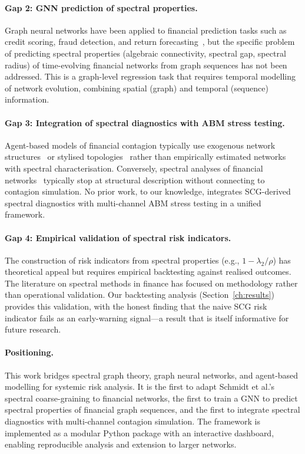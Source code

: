\paragraph{Gap 2: GNN prediction of spectral properties.}
Graph neural networks have been applied to financial prediction tasks
such as credit scoring, fraud detection, and return
forecasting~\cite{wu2020comprehensive}, but the specific problem of
predicting spectral properties (algebraic connectivity, spectral gap,
spectral radius) of time-evolving financial networks from graph
sequences has not been addressed.  This is a graph-level regression
task that requires temporal modelling of network evolution, combining
spatial (graph) and temporal (sequence) information.

\paragraph{Gap 3: Integration of spectral diagnostics with ABM stress
testing.}
Agent-based models of financial contagion typically use exogenous network
structures~\cite{nier2007network,poledna2015economics} or stylised
topologies~\cite{gai2010contagion} rather than empirically estimated
networks with spectral characterisation.  Conversely, spectral analyses
of financial networks~\cite{kyriakopoulos2009network} typically stop at
structural description without connecting to contagion simulation.  No
prior work, to our knowledge, integrates SCG-derived spectral
diagnostics with multi-channel ABM stress testing in a unified framework.

\paragraph{Gap 4: Empirical validation of spectral risk indicators.}
The construction of risk indicators from spectral properties (e.g.,
$1 - \lambda_2/\rho$) has theoretical appeal but requires empirical
backtesting against realised outcomes.  The literature on spectral
methods in finance has focused on methodology rather than operational
validation.  Our backtesting analysis (Section~\ref{ch:results})
provides this validation, with the honest finding that the naive SCG
risk indicator fails as an early-warning signal---a result that is
itself informative for future research.

\paragraph{Positioning.}  This work bridges spectral graph theory,
graph neural networks, and agent-based modelling for systemic risk
analysis.  It is the first to adapt Schmidt et al.'s spectral
coarse-graining to financial networks, the first to train a GNN to
predict spectral properties of financial graph sequences, and the
first to integrate spectral diagnostics with multi-channel contagion
simulation.  The framework is implemented as a modular Python package
with an interactive dashboard, enabling reproducible analysis and
extension to larger networks.


